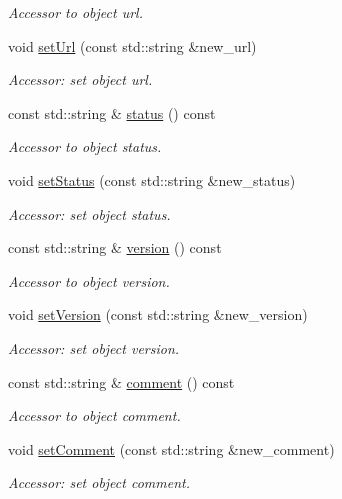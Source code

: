 \begin{DoxyCompactItemize}
\begin{DoxyCompactList}\small\item\em Accessor to object url. \end{DoxyCompactList}\item 
void \hyperlink{class_d_d4hep_1_1_geometry_1_1_header_ae7931709b0b3f36f483c4849d5022b38}{set\+Url} (const std\+::string \&new\+\_\+url)
\begin{DoxyCompactList}\small\item\em Accessor\+: set object url. \end{DoxyCompactList}\item 
const std\+::string \& \hyperlink{class_d_d4hep_1_1_geometry_1_1_header_ad06eb4b3d641ee21cc1d0fe00f65d067}{status} () const
\begin{DoxyCompactList}\small\item\em Accessor to object status. \end{DoxyCompactList}\item 
void \hyperlink{class_d_d4hep_1_1_geometry_1_1_header_a16e8e70fe306e468d81ff2691612cd6d}{set\+Status} (const std\+::string \&new\+\_\+status)
\begin{DoxyCompactList}\small\item\em Accessor\+: set object status. \end{DoxyCompactList}\item 
const std\+::string \& \hyperlink{class_d_d4hep_1_1_geometry_1_1_header_ab3a4584adab1cfb1befe3ccdfc029f01}{version} () const
\begin{DoxyCompactList}\small\item\em Accessor to object version. \end{DoxyCompactList}\item 
void \hyperlink{class_d_d4hep_1_1_geometry_1_1_header_a33ab2e124d5c8f3f2d3f05a50be4bdad}{set\+Version} (const std\+::string \&new\+\_\+version)
\begin{DoxyCompactList}\small\item\em Accessor\+: set object version. \end{DoxyCompactList}\item 
const std\+::string \& \hyperlink{class_d_d4hep_1_1_geometry_1_1_header_a64fb8a0dfb8ead8fbbda407d824c00ac}{comment} () const
\begin{DoxyCompactList}\small\item\em Accessor to object comment. \end{DoxyCompactList}\item 
void \hyperlink{class_d_d4hep_1_1_geometry_1_1_header_afd7df593939068d26d155478d6350481}{set\+Comment} (const std\+::string \&new\+\_\+comment)
\begin{DoxyCompactList}\small\item\em Accessor\+: set object comment. \end{DoxyCompactList}\end{DoxyCompactItemize}
